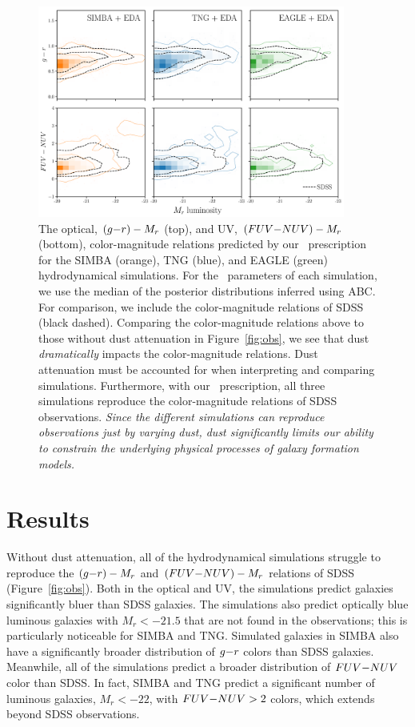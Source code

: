 \begin{figure}
\begin{center}
    \includegraphics[width=0.9\textwidth]{figs/abc_observables.pdf}
    \caption{\label{fig:dem}
    The optical, $(g{-}r) - M_r$ (top), and UV, $(FUV{-}NUV) - M_r$ (bottom),
    color-magnitude relations predicted by our \eda~prescription
    for the SIMBA (orange), TNG (blue), and EAGLE (green) hydrodynamical
    simulations. For the \eda~parameters of each simulation, we use the
    median of the posterior distributions inferred using ABC. For
    comparison, we include the color-magnitude relations of SDSS (black
    dashed). Comparing the color-magnitude relations above to those without
    dust attenuation in Figure~\ref{fig:obs}, we see that dust
    \emph{dramatically} impacts the color-magnitude relations. 
    Dust attenuation must be accounted for when interpreting and comparing
    simulations. Furthermore, with our \eda~prescription, all three
    simulations reproduce the color-magnitude relations of SDSS
    observations.  \emph{Since the different simulations can reproduce
    observations just by varying dust, dust significantly limits our ability to
    constrain the underlying physical processes of galaxy formation
    models.}
    }
\end{center}
\end{figure}

\section{Results} \label{sec:results}
Without dust attenuation, all of the hydrodynamical simulations struggle to 
reproduce the $(g{-}r) - M_r$ and $(FUV{-}NUV) - M_r$ relations of SDSS (Figure~\ref{fig:obs}). 
Both in the optical and UV, the simulations predict galaxies significantly bluer
than SDSS galaxies.
The simulations also predict optically blue luminous galaxies with $M_r <
-21.5$ that are not found in the observations; this is particularly
noticeable for SIMBA and TNG. 
Simulated galaxies in SIMBA also have a significantly broader distribution
of $g{-}r$ colors than SDSS galaxies.
Meanwhile, all of the simulations predict a broader distribution of $FUV{-}NUV$  
color than SDSS.
In fact, SIMBA and TNG predict a significant number of luminous galaxies,
$M_r < -22$, with $FUV{-}NUV > 2$ colors, which extends beyond SDSS observations.

